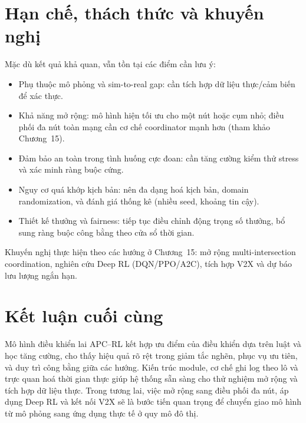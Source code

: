 \section{Hạn chế, thách thức và khuyến nghị}
Mặc dù kết quả khả quan, vẫn tồn tại các điểm cần lưu ý:
\begin{itemize}
    \item Phụ thuộc mô phỏng và sim-to-real gap: cần tích hợp dữ liệu thực/cảm biến để xác thực.
    \item Khả năng mở rộng: mô hình hiện tối ưu cho một nút hoặc cụm nhỏ; điều phối đa nút toàn mạng cần cơ chế coordinator mạnh hơn (tham khảo Chương~15).
    \item Đảm bảo an toàn trong tình huống cực đoan: cần tăng cường kiểm thử stress và xác minh ràng buộc cứng.
    \item Nguy cơ quá khớp kịch bản: nên đa dạng hoá kịch bản, domain randomization, và đánh giá thống kê (nhiều seed, khoảng tin cậy).
    \item Thiết kế thưởng và fairness: tiếp tục điều chỉnh động trọng số thưởng, bổ sung ràng buộc công bằng theo cửa sổ thời gian.
\end{itemize}
Khuyến nghị thực hiện theo các hướng ở Chương~15: mở rộng multi-intersection coordination, nghiên cứu Deep RL (DQN/PPO/A2C), tích hợp V2X và dự báo lưu lượng ngắn hạn.

\section{Kết luận cuối cùng}
Mô hình điều khiển lai APC–RL kết hợp ưu điểm của điều khiển dựa trên luật và học tăng cường, cho thấy hiệu quả rõ rệt trong giảm tắc nghẽn, phục vụ ưu tiên, và duy trì công bằng giữa các hướng. Kiến trúc module, cơ chế ghi log theo lô và trực quan hoá thời gian thực giúp hệ thống sẵn sàng cho thử nghiệm mở rộng và tích hợp dữ liệu thực. Trong tương lai, việc mở rộng sang điều phối đa nút, áp dụng Deep RL và kết nối V2X sẽ là bước tiến quan trọng để chuyển giao mô hình từ mô phỏng sang ứng dụng thực tế ở quy mô đô thị.